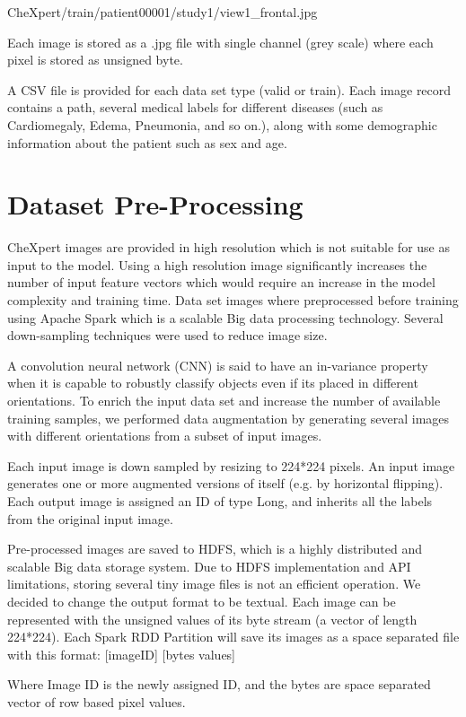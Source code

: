 \documentclass{amia}
\begin{document}
CheXpert/train/patient00001/study1/view1\_frontal.jpg

Each image is stored as a .jpg file with single channel (grey scale) where each pixel is stored as unsigned byte.

A CSV file is provided for each data set type (valid or train). Each image record contains a path, several medical labels for different diseases (such as Cardiomegaly, Edema, Pneumonia, and so on.), along with some demographic information about the patient such as sex and age.


\section*{Dataset Pre-Processing}

CheXpert\cite{ref2} images are provided in high resolution which is not suitable for use as input to the model. Using a high resolution image significantly increases the number of input feature vectors which would require an increase in the model complexity and training time. Data set images where preprocessed before training using Apache Spark which is a scalable Big data processing technology. Several down-sampling techniques were used to reduce image size.

A convolution neural network (CNN) is said to have an in-variance property when it is capable to robustly classify objects even if its placed in different orientations. To enrich the input data set and increase the number of available training samples, we performed data augmentation by generating several images with different orientations from a subset of input images.

Each input image is down sampled by resizing to 224*224 pixels. An input image generates one or more augmented versions of itself (e.g. by horizontal flipping). Each output image is assigned an ID of type Long, and inherits all the labels from the original input image.

Pre-processed images are saved to HDFS, which is a highly distributed and scalable Big data storage system. Due to HDFS implementation and API limitations, storing several tiny image files is not an efficient operation.
We decided to change the output format to be textual. Each image can be represented with the unsigned values of its byte stream (a vector of length 224*224). Each Spark RDD Partition will save its images as a space separated file with this format:
[imageID] [bytes values]

Where Image ID is the newly assigned ID, and the bytes are space separated vector of row based pixel values.
\end{document}
